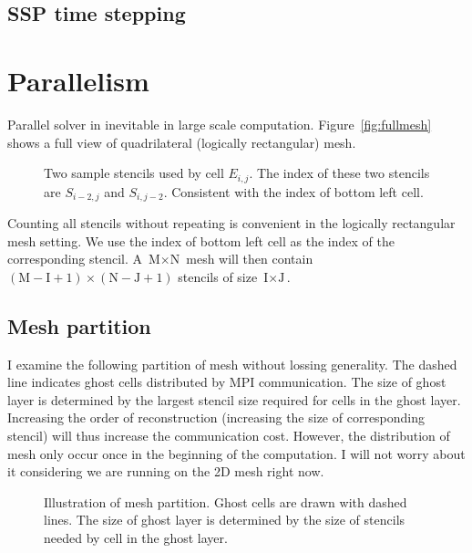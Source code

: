 \documentclass[smallextended]{svjour3}       %
\begin{document}
\subsection{SSP time stepping}

\section{Parallelism}
Parallel solver in inevitable in large scale computation.
Figure~\ref{fig:fullmesh} 
shows a full view of quadrilateral (logically rectangular) mesh.
\begin{figure}[htb]
		  \parbox{\textwidth}{\begin{minipage}[t]{0.45\textwidth}
		  
		  \caption{Logically rectangular 
		  mesh displayed in full. The index of 
		  a stencil (colored cells) is the 
		  same as the index of the red cell.}
\label{fig:fullmesh}
		  \end{minipage}
		  \hfill
		  \begin{minipage}[t]{.45\textwidth}

					 \caption{Two sample stencils used by cell $E_{i,j}$.
					 The index of these two stencils are $S_{i-2,j}$ and $S_{i,j-2}$.
					 Consistent with the index of bottom left cell.}
		  \label{fig:stencil}
		  \end{minipage}}
\end{figure}
Counting all stencils without repeating is convenient 
in the logically rectangular mesh setting. 
We use the index of bottom left cell as the index of 
the corresponding stencil. A $\text{M}\times \text{N}$ mesh will then contain
$(\text{M}-\text{I}+1)\times(\text{N}-\text{J}+1)$ stencils 
of size $\text{I}\times \text{J}$.

\subsection{Mesh partition}
I examine the following partition of mesh without lossing generality.
The dashed line indicates ghost cells distributed by
MPI communication. 
The size of ghost layer is determined by the largest stencil
size required for cells in the ghost layer.
Increasing the order of reconstruction (increasing the size
of corresponding stencil) will thus increase the communication 
cost. However, the distribution of mesh only occur once 
in the beginning of the computation. I will not worry about 
it considering we are running on the 2D mesh right now.
\begin{figure}\label{fig:partitionmesh}

		  \caption{Illustration of mesh partition.
		  Ghost cells are drawn with dashed lines.
		  The size of ghost layer is determined 
		  by the size of stencils needed by cell in 
		  the ghost layer.}
\end{figure}
\end{document}
